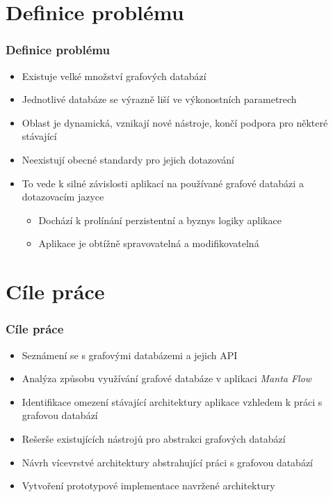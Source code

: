 \documentclass{beamer}
\begin{document}
\section{Definice problému}
\begin{frame}
\frametitle{Definice problému}
   \begin{itemize}
      \item Existuje velké množství grafových databází
      \item Jednotlivé databáze se výrazně liší ve výkonostních parametrech
      \item Oblast je dynamická, vznikají nové nástroje, končí podpora pro některé stávající
      \item Neexistují obecné standardy pro jejich dotazování
      \item To vede k silné závislosti aplikací na používané grafové databázi a dotazovacím jazyce
      \begin{itemize}
         \item Dochází k prolínání perzistentní a byznys logiky aplikace
         \item Aplikace je obtížně spravovatelná a modifikovatelná
      \end{itemize}
   \end{itemize}
\end{frame}

\section{Cíle práce}
\begin{frame}
\frametitle{Cíle práce}
   \begin{itemize}
      \item Seznámení se s grafovými databázemi a jejich API
      \item Analýza způsobu využívání grafové databáze v aplikaci \textit{Manta Flow}
      \item Identifikace omezení stávající architektury aplikace vzhledem k práci s grafovou databází
      \item Rešerše existujících nástrojů pro abstrakci grafových databází
      \item Návrh vícevrstvé architektury abstrahující práci s grafovou databází
      \item Vytvoření prototypové implementace navržené architektury
   \end{itemize}
\end{frame}
\end{document}

